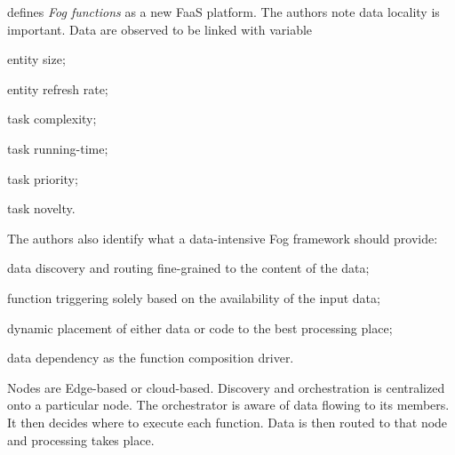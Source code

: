 \documentclass[11pt]{sdm}
\begin{document}
\begin{description}[leftmargin=10pt]
	\item[\citet{cheng_fog_2019}] defines \textit{Fog functions} as a new \gls{FaaS} platform. The authors note data locality is important. Data are observed to be linked with variable
		\begin{enumerate*}[(i)]
			\item entity size;
			\item entity refresh rate;
			\item task complexity;
			\item task running-time;
			\item task priority;
			\item task novelty.
		\end{enumerate*}
		The authors also identify what a data-intensive Fog framework should provide:
		\begin{enumerate*}[(a)]
			\item data discovery and routing fine-grained to the content of the data;
			\item function triggering solely based on the availability of the input data;
			\item dynamic placement of either data or code to the best processing place;
			\item data dependency as the function composition driver.
		\end{enumerate*}
		Nodes are Edge-based or cloud-based. Discovery and orchestration is centralized onto a particular node. The orchestrator is aware of data flowing to its members. It then decides where to execute each function. Data is then routed to that node and processing takes place.


\end{description}
\end{document}
